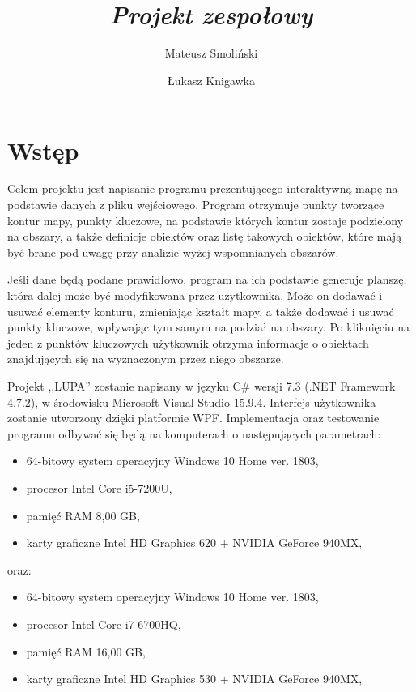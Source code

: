 \documentclass[a4paper,11pt]{article}
\title{ \sc{Specyfikacja implementacyjna} \\
\emph{Projekt zespołowy} }
\author{Mateusz Smoliński \and Łukasz Knigawka}
\newcommand\tab[1][0.6cm]{\hspace*{#1}}
\begin{document}
\maketitle

\thispagestyle{empty}

\tableofcontents

\newpage

\section{Wstęp}

\tab Celem projektu jest napisanie programu prezentującego interaktywną mapę na podstawie danych z pliku wejściowego. Program otrzymuje punkty tworzące kontur mapy, punkty kluczowe, na podstawie których kontur zostaje podzielony na obszary, a także definicje obiektów oraz listę takowych obiektów, które mają być brane pod uwagę przy analizie wyżej wspomnianych obszarów.

Jeśli dane będą podane prawidłowo, program na ich podstawie generuje planszę, która dalej może być modyfikowana przez użytkownika. Może on dodawać i usuwać elementy konturu, zmieniając kształt mapy, a także dodawać i usuwać punkty kluczowe, wpływając tym samym na podział na obszary. Po kliknięciu na jeden z punktów kluczowych użytkownik otrzyma informacje o obiektach znajdujących się na wyznaczonym przez niego obszarze.

Projekt ,,LUPA'' zostanie napisany w języku C\# wersji 7.3 (.NET Framework 4.7.2), w środowisku Microsoft Visual Studio 15.9.4. Interfejs użytkownika zostanie utworzony dzięki platformie WPF. Implementacja oraz testowanie programu odbywać się będą na komputerach o następujących parametrach: 
\begin{itemize}

\item 64-bitowy system operacyjny Windows 10 Home ver. 1803,
\item procesor Intel Core i5-7200U,
\item pamięć RAM 8,00 GB,
\item karty graficzne Intel HD Graphics 620 + NVIDIA GeForce 940MX,

\end{itemize}

oraz:

\begin{itemize}

\item 64-bitowy system operacyjny Windows 10 Home ver. 1803,
\item procesor Intel Core i7-6700HQ,
\item pamięć RAM 16,00 GB,
\item karty graficzne Intel HD Graphics 530 + NVIDIA GeForce 940MX,

\end{itemize}
\end{document}
